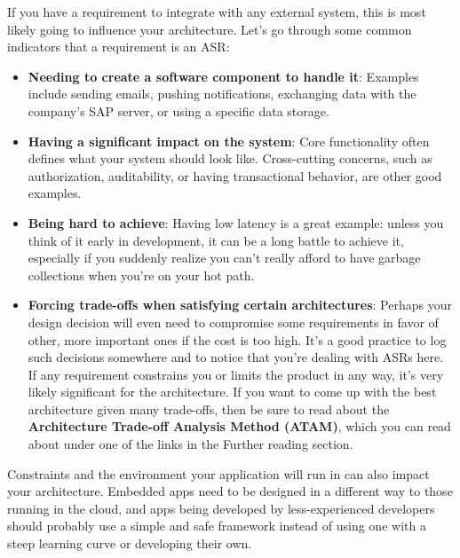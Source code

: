 If you have a requirement to integrate with any external system, this is most likely going to influence your architecture. Let's go through some common indicators that a requirement is an ASR:


\begin{itemize}
\item 
\textbf{Needing to create a software component to handle it}: Examples include sending emails, pushing notifications, exchanging data with the company's SAP server, or using a specific data storage.


\item 
\textbf{Having a significant impact on the system}: Core functionality often defines what your system should look like. Cross-cutting concerns, such as authorization, auditability, or having transactional behavior, are other good examples.


\item 
\textbf{Being hard to achieve}: Having low latency is a great example: unless you think of it early in development, it can be a long battle to achieve it, especially if you suddenly realize you can't really afford to have garbage collections when you're on your hot path.

\item 
\textbf{Forcing trade-offs when satisfying certain architectures}: Perhaps your design decision will even need to compromise some requirements in favor of other, more important ones if the cost is too high. It's a good practice to log such decisions somewhere and to notice that you're dealing with ASRs here. If any requirement constrains you or limits the product in any way, it's very likely significant for the architecture. If you want to come up with the best architecture given many trade-offs, then be sure to read about the \textbf{Architecture Trade-off Analysis Method (ATAM)}, which you can read about under one of the links in the Further reading section.

\end{itemize}

Constraints and the environment your application will run in can also impact your architecture. Embedded apps need to be designed in a different way to those running in the cloud, and apps being developed by less-experienced developers should probably use a simple and safe framework instead of using one with a steep learning curve or developing their own.


